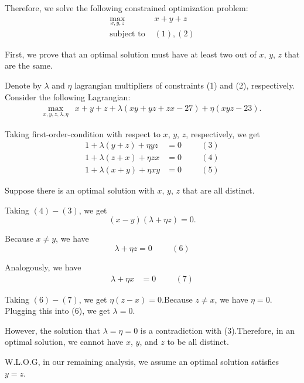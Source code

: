 \begin{enumerate}
 Therefore, we solve the following constrained optimization problem:\begin{align*}\max_{x,y,z} \ & x + y + z \\\mbox{subject to } & (1), (2) \end{align*}


 First, we prove that an optimal solution must have at least two out of $x$, $y$, $z$ that are the same.

 Denote by $\lambda$ and $\eta$ lagrangian multipliers of constraints (1) and (2), respectively. Consider the following Lagrangian:\begin{align*}\max_{x,y,z, \lambda, \eta} & x + y + z + \lambda \left( xy + yz + zx - 27 \right)+ \eta \left( xyz - 23 \right) .\end{align*}


 Taking first-order-condition with respect to $x$, $y$, $z$, respectively, we get\begin{align*}1 + \lambda \left( y + z \right) + \eta yz & = 0 \hspace{1cm} (3) \\1 + \lambda \left( z + x \right) + \eta zx & = 0 \hspace{1cm} (4) \\1 + \lambda \left( x + y \right) + \eta xy & = 0 \hspace{1cm} (5)\end{align*}


 Suppose there is an optimal solution with $x$, $y$, $z$ that are all distinct.

 Taking $(4)-(3)$, we get
 \[ \left( x - y \right) \left( \lambda + \eta z \right) = 0 . \]

 Because $x \neq y$, we have
 \[ \lambda + \eta z = 0 \hspace{1cm} (6) \]

 Analogously, we have\begin{align*}\lambda + \eta x & = 0 \hspace{1cm} (7) \end{align*}
 

 Taking $(6) - (7)$, we get $\eta \left( z - x \right) = 0$.Because $z \neq x$, we have $\eta = 0$. Plugging this into (6), we get $\lambda = 0$.

 However, the solution that $\lambda = \eta = 0$ is a contradiction with (3).Therefore, in an optimal solution, we cannot have $x$, $y$, and $z$ to be all distinct.

 W.L.O.G, in our remaining analysis, we assume an optimal solution satisfies $y = z$.


\end{enumerate}
